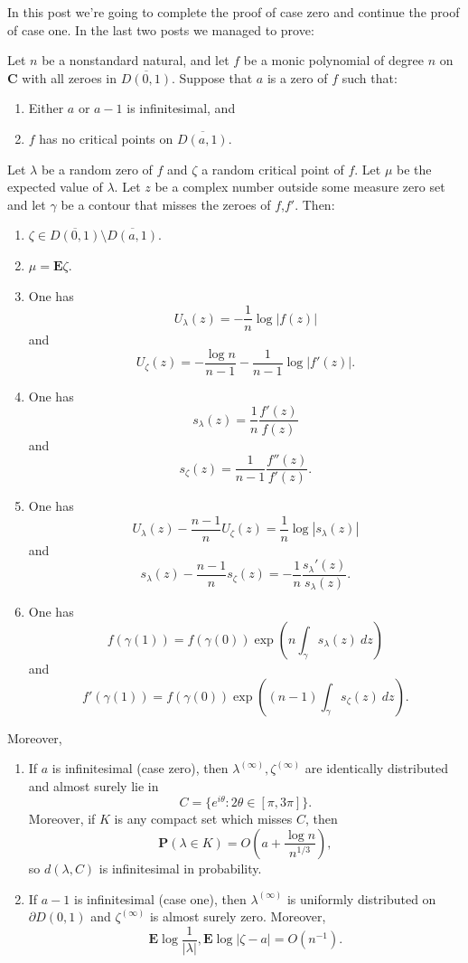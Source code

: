 \documentclass[12pt]{article}
\begin{document}

In this post we're going to complete the proof of case zero and continue the proof of case one. In the last two posts we managed to prove:

\begin{theorem}
Let $n$ be a nonstandard natural, and let $f$ be a monic polynomial of degree $n$ on $\mathbf C$ with all zeroes in $\overline{D(0, 1)}$.
Suppose that $a$ is a zero of $f$ such that:
\begin{enumerate}
\item Either $a$ or $a - 1$ is infinitesimal, and
\item $f$ has no critical points on $\overline{D(a, 1)}$.
\end{enumerate}
Let $\lambda$ be a random zero of $f$ and $\zeta$ a random critical point of $f$.
Let $\mu$ be the expected value of $\lambda$.
Let $z$ be a complex number outside some measure zero set and let $\gamma$ be a contour that misses the zeroes of $f$,$f'$. Then:
\begin{enumerate}
\item $\zeta \in \overline{D(0, 1)} \setminus \overline{D(a, 1)}$.
\item $\mu = \mathbf E \zeta$.
\item One has
$$U_\lambda(z) = -\frac{1}{n} \log |f(z)|$$
and
$$U_\zeta(z) = -\frac{\log n}{n - 1} - \frac{1}{n-1} \log |f'(z)|.$$
\item One has
$$s_\lambda(z) = \frac{1}{n} \frac{f'(z)}{f(z)}$$
and
$$s_\zeta(z) = \frac{1}{n - 1} \frac{f''(z)}{f'(z)}.$$
\item One has
$$U_\lambda(z) - \frac{n - 1}{n} U_\zeta(z) = \frac{1}{n} \log |s_\lambda(z)|$$
and
$$s_\lambda(z) - \frac{n - 1}{n} s_\zeta(z) = -\frac{1}{n} \frac{s_\lambda'(z)}{s_\lambda(z)}.$$
\item One has
$$f(\gamma(1)) = f(\gamma(0)) \exp \left(n \int_\gamma s_\lambda(z) ~dz\right)$$
and
$$f'(\gamma(1)) = f(\gamma(0)) \exp\left((n-1) \int_\gamma s_\zeta(z) ~dz\right).$$
\end{enumerate}
Moreover,
\begin{enumerate}
\item If $a$ is infinitesimal (case zero), then $\lambda^{(\infty)},\zeta^{(\infty)}$ are identically distributed and almost surely lie in
$$C = \{e^{i\theta}: 2\theta \in [\pi, 3\pi]\}.$$
Moreover, if $K$ is any compact set which misses $C$, then
$$\mathbf P(\lambda \in K) = O\left(a + \frac{\log n}{n^{1/3}}\right),$$
so $d(\lambda, C)$ is infinitesimal in probability.
\item If $a - 1$ is infinitesimal (case one), then $\lambda^{(\infty)}$ is uniformly distributed on $\partial D(0, 1)$ and $\zeta^{(\infty)}$ is almost surely zero.
Moreover,
$$\mathbf E \log \frac{1}{|\lambda|}, \mathbf E \log |\zeta - a| = O(n^{-1}).$$
\end{enumerate}
\end{theorem}
\end{document}

